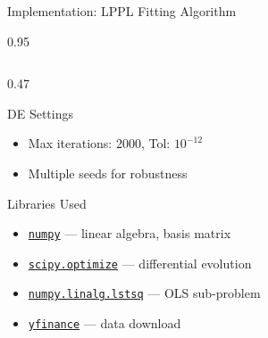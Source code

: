 \documentclass[9pt, aspectratio=169, t]{beamer}
\begin{document}
\begin{frame}{Implementation: LPPL Fitting Algorithm}
\begin{cminipage}{0.95\textwidth}
{\begin{columns}[T]
\begin{column}{0.47\textwidth}
\begin{alertblock}{DE Settings}
\begin{itemize}
                    \item Max iterations: 2000, Tol: $10^{-12}$
                    \item Multiple seeds for robustness
                \end{itemize}
            \end{alertblock}
            \vspace{-1mm}
            \begin{block}{Libraries Used}
                \begin{itemize}\setlength{\itemsep}{0pt}
                    \item \href{https://numpy.org}{\texttt{numpy}} --- linear algebra, basis matrix
                    \item \href{https://docs.scipy.org/doc/scipy/reference/generated/scipy.optimize.differential\_evolution.html}{\texttt{scipy.optimize}} --- differential evolution
                    \item \href{https://numpy.org/doc/stable/reference/generated/numpy.linalg.lstsq.html}{\texttt{numpy.linalg.lstsq}} --- OLS sub-problem
                    \item \href{https://pypi.org/project/yfinance/}{\texttt{yfinance}} --- data download
                \end{itemize}
            \end{block}
        \end{column}
    \end{columns}
    }
    \hfill{}
    \end{cminipage}
\end{frame}

\end{document}
